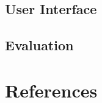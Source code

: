 \documentclass[12pt,a4paper]{article}
\begin{document}
\subsection{User Interface}

\subsection{Evaluation}
%
%
%

\section{References}
\end{document}
